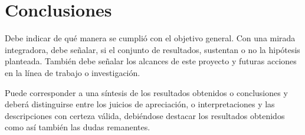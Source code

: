 \setcounter{figure}{0} %
\renewcommand{\thefigure}{\thesection.\arabic{figure}}
\chapter{Conclusiones}

Debe indicar de qué manera se cumplió con el objetivo general. Con una mirada integradora, debe señalar, si el conjunto de resultados, sustentan o no la hipótesis planteada. También debe señalar los alcances de este proyecto y futuras acciones en la línea de trabajo o investigación.\par
Puede corresponder a una síntesis de los resultados obtenidos o conclusiones y deberá distinguirse entre los juicios de apreciación, o interpretaciones y las descripciones con certeza válida, debiéndose destacar los resultados obtenidos como así también las dudas remanentes. 
